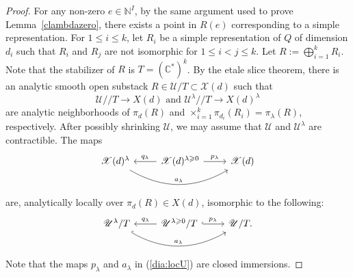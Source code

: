 \documentclass [11pt,oneside,a4paper,mathscr]{amsart}
\theoremstyle{definition}
\renewcommand{\leq}{\leqslant}
\renewcommand{\geq}{\geqslant}
\newcommand{\X}{\mathscr{X}}
\newcommand{\ssslash}{/\!\!/}
\begin{document}
\begin{proof}
For any non-zero $e\in \mathbb{N}^I$, by the same argument used to prove Lemma~\ref{clambdazero},  there exists a point in $R(e)$ corresponding to a simple representation. 
For $1\leq i\leq k$, let $R_i$ be a simple representation of $Q$ of dimension $d_i$ such that $R_i$ and $R_j$ are not isomorphic for $1\leq i<j\leq k$. Let $R:=\bigoplus_{i=1}^k R_i$. Note that the stabilizer of $R$ is $T=(\mathbb{C}^*)^k$. By the etale slice theorem, there is an analytic smooth open substack $R\in \mathscr{U}/T\subset \X(d)$ such that \[\mathscr{U}\ssslash T\to X(d)\text{ and }\mathscr{U}^\lambda \ssslash T \to X(d)^\lambda\] are analytic neighborhoods of $\pi_d(R)$ and $\times_{i=1}^k \pi_{d_i}(R_i)=\pi_\lambda(R)$, respectively. After possibly shrinking $\mathscr{U}$, we may assume that $\mathscr{U}$ and $\mathscr{U}^\lambda$ are contractible. The maps 
\begin{equation*}
    \begin{tikzcd}
        \X(d)^\lambda \arrow[rr, bend right, "a_\lambda"] & \X(d)^{\lambda\geq 0}\arrow[l, "q_\lambda"']\arrow[r, "p_\lambda"] & \X(d)
    \end{tikzcd}
\end{equation*}
are, analytically locally over $\pi_d(R)\in X(d)$, isomorphic to the following:
\begin{equation}\label{dia:locU}
    \begin{tikzcd}
        \mathscr{U}^\lambda/T \arrow[rr, hook, bend right, "a_\lambda"] & \mathscr{U}^{\lambda\geq 0}/T\arrow[l,  "q_\lambda"']\arrow[r, hook, "p_\lambda"] & \mathscr{U}/T.
    \end{tikzcd}
\end{equation}
Note that the maps $p_\lambda$ and $a_\lambda$ in (\ref{dia:locU}) are closed immersions.

\end{proof}
\end{document}

